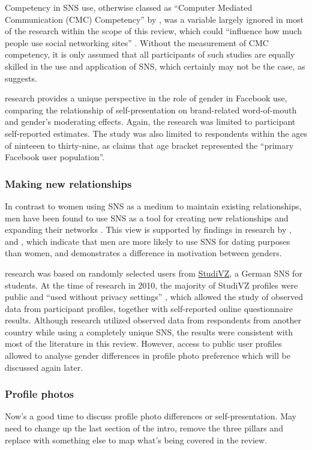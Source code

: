 Competency in SNS use, otherwise classed as ``Computer Mediated Communication (CMC) Competency'' by \citet[p. 579]{Ross2009}, was a variable largely ignored in most of the research within the scope of this review, which could ``influence how much people use social networking sites'' \citep[p. 898]{Kimbrough2013}. Without the measurement of CMC competency, it is only assumed that all participants of such studies are equally skilled in the use and application of SNS, which certainly may not be the case, as \citet{Ross2009} suggests.

 research provides a unique perspective in the role of gender in Facebook use, comparing the relationship of self-presentation on brand-related word-of-mouth and gender's moderating effects. Again, the research was limited to participant self-reported estimates. The study was also limited to respondents within the ages of ninteeen to thirty-nine, as \citet[p. 3]{Choi2014} claims that age bracket represented the ``primary Facebook user population''.

\subsubsection{Making new relationships}

In contrast to women using SNS as a medium to maintain existing relationships, men have been found to use SNS as a tool for creating new relationships and expanding their networks \citep{Mazman2011}. This view is supported by findings in research by \citet{Muscanell2012}, \citet{Raacke2008} and \citet{Haferkamp2012}, which indicate that men are more likely to use SNS for dating purposes than women, and demonstrates a difference in motivation between genders.

 research was based on randomly selected users from \href{http://www.studivz.net}{StudiVZ}, a German SNS for students. At the time of research in 2010, the majority of StudiVZ profiles were public and ``used without privacy settings'' \citep[p. 92]{Haferkamp2012}, which allowed the study of observed data from participant profiles, together with self-reported online questionnaire results. Although  research utilized observed data from respondents from another country while using a completely unique SNS, the results were consistent with most of the literature in this review. However, access to public user profiles allowed \citet{Haferkamp2012} to analyse gender differences in profile photo preference which will be discussed again later.

\subsubsection{Profile photos}

Now's a good time to discuss profile photo differences or self-presentation. May need to change up the last section of the intro, remove the three pillars and replace with something else to map what's being covered in the review. 